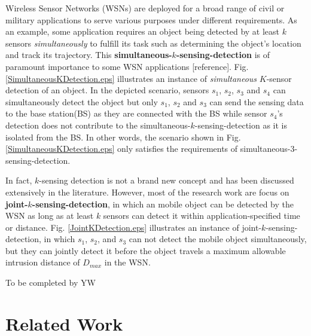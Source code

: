 \documentclass[10pt, conference, compsocconf, twocolumn]{IEEEtran}
\begin{document}
Wireless Sensor Networks (WSNs) are deployed for a broad range of
civil or military applications to serve various purposes under
different requirements. As an example, some application requires an
object being detected by at least $k$ sensors \emph{simultaneously}
to fulfill its task such as determining the object's location and
track its trajectory. This
\textbf{simultaneous-$k$-sensing-detection} is of paramount
importance to some WSN applications [reference]. Fig.
\ref{SimultaneousKDetection.eps} illustrates an instance of
\emph{simultaneous }$K$-sensor detection of an object. In the
depicted scenario, sensors $s_1$, $s_2$, $s_3$ and $s_4$ can
simultaneously detect the object but only $s_1$, $s_2$ and $s_3$ can
send the sensing data to the base station(BS) as they are connected
with the BS while sensor $s_4$'s detection does not contribute to
the simultaneous-$k$-sensing-detection as it is isolated from the
BS.  In other words, the scenario shown in Fig.
\ref{SimultaneousKDetection.eps} only satisfies the requirements of
simultaneous-$3$-sensing-detection.

In fact, $k$-sensing detection is not a brand new concept and has
been discussed extensively in the literature. However, most of the
research work are focus on \textbf{joint-$k$-sensing-detection}, in
which an mobile object can be detected by the WSN as long as at
least $k$ sensors can detect it within application-specified time or
distance. Fig. \ref{JointKDetection.eps} illustrates an instance of
joint-$k$-sensing-detection, in which $s_1$, $s_2$, and $s_3$ can
not detect the mobile object simultaneously, but they can jointly
detect it before the object travels a maximum allowable intrusion
distance of $D_{max}$ in the WSN.

To be completed by YW



%
%

\section{Related Work} \label{sec:related_work}
\end{document}
